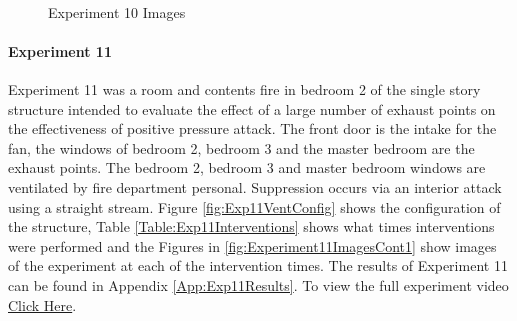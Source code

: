 \documentclass{article}
\begin{document}
\begin{figure}[H]
	\ContinuedFloat 
	\centering 
	 \ 
	 \ 
	\caption{Experiment 10 Images}
	\label{fig:Experiment10ImagesCont3} 
\end{figure}

\paragraph{Experiment 11}\mbox{}

Experiment 11 was a room and contents fire in bedroom 2 of the single story structure intended to evaluate the effect of a large number of exhaust points on the effectiveness of positive pressure attack. The front door is the intake for the fan, the windows of bedroom 2, bedroom 3 and the master bedroom are the exhaust points. The bedroom 2, bedroom 3 and master bedroom windows are ventilated by fire department personal. Suppression occurs via an interior attack using a straight stream. Figure \ref{fig:Exp11VentConfig} shows the configuration of the structure, Table \ref{Table:Exp11Interventions} shows what times interventions were performed and the Figures in \ref{fig:Experiment11ImagesCont1} show images of the experiment at each of the intervention times. The results of Experiment 11 can be found in Appendix \ref{App:Exp11Results}. To view the full experiment video \href{https://youtu.be/XlgvKuJ40kU}{Click Here}.
\end{document}
